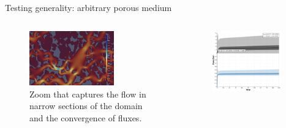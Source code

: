 \documentclass{beamer}
\begin{document}
	\begin{frame}{Testing generality: arbitrary porous medium}
		\begin{columns}
			\begin{figure}
				\centering
				\includegraphics[width=0.7\textwidth]{pics/pmVelLowVRed}
				\caption{Zoom that captures the flow in narrow sections of the domain and the convergence of fluxes.}   
			\end{figure}
			 \begin{figure}
			 	\centering
			 	\includegraphics[width=0.9\textwidth]{pics/pmGlobal.png}
			 \end{figure}
		\end{columns}
	\end{frame}
\end{document}
